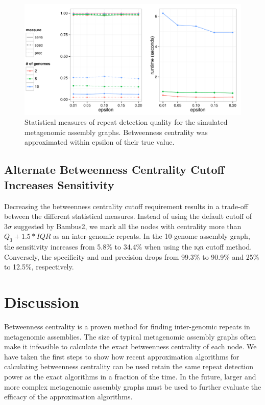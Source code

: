 \documentclass[runningheads,a4paper]{llncs}
\begin{document}
\begin{figure}[htbp]
\centering
\includegraphics[width = \textwidth]{sampled_paths}
\caption{Statistical measures of repeat detection quality for the simulated metagenomic assembly graphs. Betweenness centrality was approximated within epsilon of their true value.}
\label{fig:sampled_paths}
\end{figure}

\subsection*{Alternate Betweenness Centrality Cutoff Increases Sensitivity}

Decreasing the betweenness centrality cutoff requirement results in a trade-off between the different statistical measures.
Instead of using the default cutoff of $3\sigma$ suggested by Bambus2, we mark all the nodes with centrality more than $Q_{3} + 1.5*IQR$ as an inter-genomic repeats.
In the 10-genome assembly graph, the sensitivity increases from 5.8\% to 34.4\% when using the \textsc{iqr} cutoff method.
Conversely, the specificity and and precision drops from 99.3\% to 90.9\% and 25\% to 12.5\%, respectively.


\section{Discussion}
Betweenness centrality is a proven method for finding inter-genomic repeats in metagenomic assemblies.
The size of typical metagenomic assembly graphs often make it infeasible to calculate the exact betweenness centrality of each node.
We have taken the first steps to show how recent approximation algorithms for calculating betweenness centrality can be used retain the same repeat detection power as the exact algorithms in a fraction of the time.
In the future, larger and more complex metagenomic assembly graphs must be used to further evaluate the efficacy of the approximation algorithms.
\end{document}
